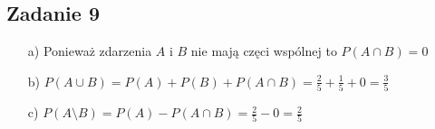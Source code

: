 \subsection{Zadanie 9}

\begin{itemize}
\item[a)] Ponieważ zdarzenia $A$ i $B$ nie mają częci wspólnej to $P(A \cap B) = 0$
\item[b)]$ P(A \cup B) = P(A) + P(B) + P(A \cap B) = \frac{2}{5} + \frac{1}{5} + 0 = \frac{3}{5}$
\item[c)] $P(A \setminus B) = P(A) - P(A \cap B) = \frac{2}{5} - 0 = \frac{2}{5}$
\end{itemize}


